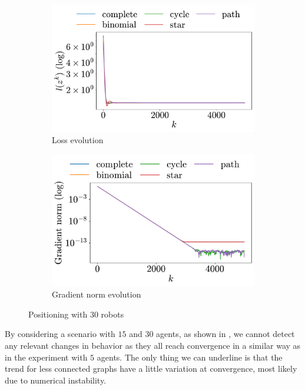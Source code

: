 \documentclass[a4paper,11pt,oneside]{book}
\begin{document}
\begin{figure}[h!]
      \centering
      \begin{subfigure}[h]{0.43\linewidth}
            \centering
            \includegraphics[width=\linewidth]{./figs/aggregative/lots_agents/loss.pdf} 
            \caption{Loss evolution}
      \end{subfigure}
      \hfill
      \begin{subfigure}[h]{0.4\linewidth}
            \centering
            \includegraphics[width=\linewidth]{./figs/aggregative/lots_agents/gradient.pdf} 
            \caption{Gradient norm evolution}
      \end{subfigure}
      \caption{Positioning with $30$ robots}
      \label{fig:positioning_30}
\end{figure}

By considering a scenario with $15$ and $30$ agents, as shown in , we cannot detect any relevant changes in behavior as they all reach convergence in a similar way as in the experiment with $5$ agents. The only thing we can underline is that the trend for less connected graphs have a little variation at convergence, most likely due to numerical instability.
\end{document}
